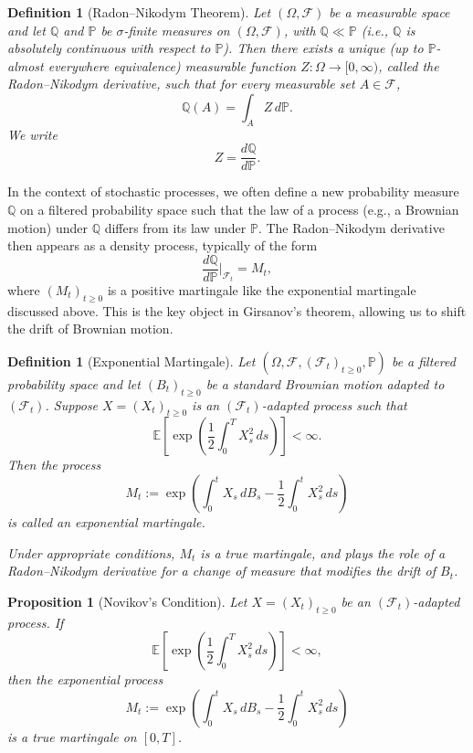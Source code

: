 \documentclass[11pt, twoside]{report}
\newtheorem{proposition}[theorem]{Proposition}
\newtheorem{definition}[theorem]{Definition}
\begin{document}
\begin{definition}[Radon--Nikodym Theorem]
Let $(\Omega, \mathcal{F})$ be a measurable space and let $\mathbb{Q}$ and $\mathbb{P}$ be $\sigma$-finite measures on $(\Omega, \mathcal{F})$, with $\mathbb{Q} \ll \mathbb{P}$ (i.e., $\mathbb{Q}$ is absolutely continuous with respect to $\mathbb{P}$). Then there exists a unique (up to $\mathbb{P}$-almost everywhere equivalence) measurable function $Z : \Omega \to [0,\infty)$, called the Radon--Nikodym derivative, such that for every measurable set $A \in \mathcal{F}$,
\[
\mathbb{Q}(A) = \int_A Z \, d\mathbb{P}.
\]
We write
\[
Z = \frac{d\mathbb{Q}}{d\mathbb{P}}.
\]
\end{definition}
In the context of stochastic processes, we often define a new probability measure $\mathbb{Q}$ on a filtered probability space such that the law of a process (e.g., a Brownian motion) under $\mathbb{Q}$ differs from its law under $\mathbb{P}$. The Radon--Nikodym derivative then appears as a density process, typically of the form
\[
\frac{d\mathbb{Q}}{d\mathbb{P}} \bigg|_{\mathcal{F}_t} = M_t,
\]
where $(M_t)_{t \geq 0}$ is a positive martingale like the exponential martingale discussed above. This is the key object in Girsanov’s theorem, allowing us to shift the drift of Brownian motion.

\begin{definition}[Exponential Martingale]
Let $(\Omega, \mathcal{F}, (\mathcal{F}_t)_{t \geq 0}, \mathbb{P})$ be a filtered probability space and let $(B_t)_{t \geq 0}$ be a standard Brownian motion adapted to $(\mathcal{F}_t)$. Suppose $X = (X_t)_{t \geq 0}$ is an $(\mathcal{F}_t)$-adapted process such that
\[
\mathbb{E} \left[ \exp\left( \frac{1}{2} \int_0^T X_s^2 \, ds \right) \right] < \infty.
\]
Then the process
\[
M_t := \exp\left( \int_0^t X_s \, dB_s - \frac{1}{2} \int_0^t X_s^2 \, ds \right)
\]
is called an \emph{exponential martingale}.

\medskip
Under appropriate conditions, $M_t$ is a true martingale, and plays the role of a Radon--Nikodym derivative for a change of measure that modifies the drift of $B_t$.
\end{definition}

\begin{proposition}[Novikov’s Condition] \label{nov_cond}
Let $X = (X_t)_{t \geq 0}$ be an $(\mathcal{F}_t)$-adapted process. If
\[
\mathbb{E} \left[ \exp\left( \frac{1}{2} \int_0^T X_s^2 \, ds \right) \right] < \infty,
\]
then the exponential process
\[
M_t := \exp\left( \int_0^t X_s \, dB_s - \frac{1}{2} \int_0^t X_s^2 \, ds \right)
\]
is a true martingale on $[0,T]$.
\end{proposition}
\medskip
\end{document}
